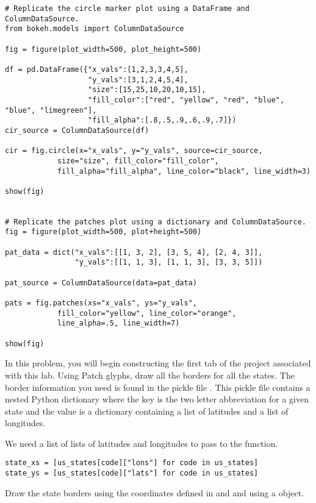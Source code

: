 \begin{lstlisting}
# Replicate the circle marker plot using a DataFrame and ColumnDataSource.
from bokeh.models import ColumnDataSource

fig = figure(plot_width=500, plot_height=500)

df = pd.DataFrame({"x_vals":[1,2,3,3,4,5],
                   "y_vals":[3,1,2,4,5,4],
                   "size":[15,25,10,20,10,15],
                   "fill_color":["red", "yellow", "red", "blue", "blue", "limegreen"],
                   "fill_alpha":[.8,.5,.9,.6,.9,.7]})
cir_source = ColumnDataSource(df)

cir = fig.circle(x="x_vals", y="y_vals", source=cir_source,
            size="size", fill_color="fill_color",
            fill_alpha="fill_alpha", line_color="black", line_width=3)

show(fig)


# Replicate the patches plot using a dictionary and ColumnDataSource.
fig = figure(plot_width=500, plot+height=500)

pat_data = dict("x_vals":[[1, 3, 2], [3, 5, 4], [2, 4, 3]],
                "y_vals":[[1, 1, 3], [1, 1, 3], [3, 3, 5]])

pat_source = ColumnDataSource(data=pat_data)

pats = fig.patches(xs="x_vals", ys="y_vals",
            fill_color="yellow", line_color="orange",
            line_alpha=.5, line_width=7)

show(fig)

\end{lstlisting}

\begin{problem} \label{prob:borders}
In this problem, you will begin constructing the first tab of the project
associated with this lab. Using Patch glyphs, draw all the borders for all the
states. The border information you need is found in the pickle file
. This pickle file contains a nested Python dictionary
where the key is the two letter abbreviation for a given state and the value is
a dictionary containing a list of latitudes and a list of longitudes.

We need a list of lists of latitudes and longitudes to pass to the
 function.

\begin{lstlisting}
state_xs = [us_states[code]["lons"] for code in us_states]
state_ys = [us_states[code]["lats"] for code in us_states]
\end{lstlisting}

Draw the state borders using the coordinates defined in  and
 and using a  object.
\end{problem}

